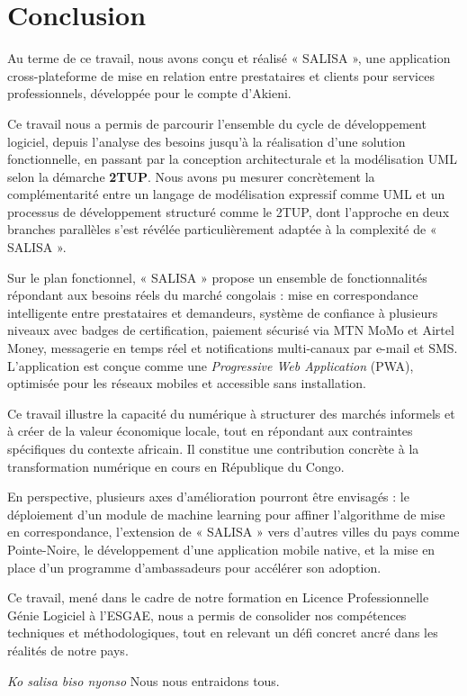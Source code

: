 \chapter*{Conclusion}
\pagestyle{styleGlobal}
\label{sec:conclusion}

Au terme de ce travail, nous avons conçu et réalisé « SALISA », une application cross-plateforme de mise en relation entre prestataires et clients pour services professionnels, développée pour le compte d'Akieni.

Ce travail nous a permis de parcourir l'ensemble du cycle de développement logiciel, depuis l'analyse des besoins jusqu'à la réalisation d'une solution fonctionnelle, en passant par la conception architecturale et la modélisation UML selon la démarche \textbf{2TUP}. Nous avons pu mesurer concrètement la complémentarité entre un langage de modélisation expressif comme UML et un processus de développement structuré comme le 2TUP, dont l'approche en deux branches parallèles s'est révélée particulièrement adaptée à la complexité de « SALISA ».

Sur le plan fonctionnel, « SALISA » propose un ensemble de fonctionnalités répondant aux besoins réels du marché congolais : mise en correspondance intelligente entre prestataires et demandeurs, système de confiance à plusieurs niveaux avec badges de certification, paiement sécurisé via MTN MoMo et Airtel Money, messagerie en temps réel et notifications multi-canaux par e-mail et SMS. L'application est conçue comme une \textit{Progressive Web Application} (PWA), optimisée pour les réseaux mobiles et accessible sans installation.

Ce travail illustre la capacité du numérique à structurer des marchés informels et à créer de la valeur économique locale, tout en répondant aux contraintes spécifiques du contexte africain. Il constitue une contribution concrète à la transformation numérique en cours en République du Congo.

En perspective, plusieurs axes d'amélioration pourront être envisagés : le déploiement d'un module de machine learning pour affiner l'algorithme de mise en correspondance, l'extension de « SALISA » vers d'autres villes du pays comme Pointe-Noire, le développement d'une application mobile native, et la mise en place d'un programme d'ambassadeurs pour accélérer son adoption.

Ce travail, mené dans le cadre de notre formation en Licence Professionnelle Génie Logiciel à l'ESGAE, nous a permis de consolider nos compétences techniques et méthodologiques, tout en relevant un défi concret ancré dans les réalités de notre pays.

\vspace{1cm}
\begin{flushright}
	\textit{Ko salisa biso nyonso} \textbar{} Nous nous entraidons tous.
\end{flushright}